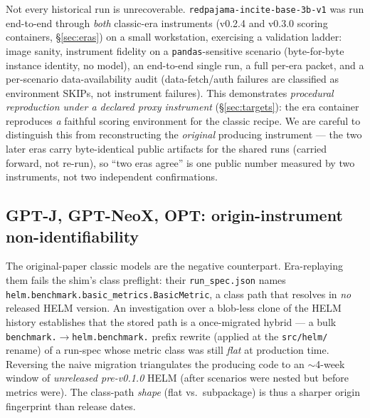 Not every historical run is unrecoverable. \texttt{redpajama-incite-base-3b-v1}
\citep{together2023redpajama} was run end-to-end through \emph{both} classic-era instruments (v0.2.4 and v0.3.0
scoring containers, \S\ref{sec:eras}) on a small workstation, exercising a
validation ladder: image sanity, instrument fidelity on a \texttt{pandas}-sensitive
scenario (byte-for-byte instance identity, no model), an end-to-end single run, a
full per-era packet, and a per-scenario data-availability audit (data-fetch/auth
failures are classified as environment SKIPs, not instrument failures). This
demonstrates \emph{procedural reproduction under a declared proxy instrument}
(\S\ref{sec:targets}): the era container reproduces \emph{a} faithful scoring
environment for the classic recipe. We are careful to distinguish this from
reconstructing the \emph{original} producing instrument --- the two later eras
carry byte-identical public artifacts for the shared runs (carried forward, not
re-run), so ``two eras agree'' is one public number measured by two instruments,
not two independent confirmations.
\par\smallskip\noindent{}\par\smallskip

\subsection{GPT-J, GPT-NeoX, OPT: origin-instrument non-identifiability}
\label{sec:classic}

The original-paper classic models
\citep{wang2021gptj,black2022gptneox,zhang2022opt} are the negative counterpart.
Era-replaying them
fails the shim's class preflight: their \texttt{run\_spec.json} names
\texttt{helm.benchmark.basic\_metrics.BasicMetric}, a class path that resolves in
\emph{no} released HELM version. An investigation over a blob-less clone of the
HELM history establishes that the stored path is a once-migrated hybrid --- a bulk
\texttt{benchmark.}$\to$\texttt{helm.benchmark.} prefix rewrite (applied at the
\texttt{src/helm/} rename) of a run-spec whose metric class was still \emph{flat} at
production time. Reversing the naive migration triangulates the producing code to
an ${\sim}$4-week window of \emph{unreleased pre-v0.1.0} HELM (after scenarios
were nested but before metrics were). The class-path \emph{shape} (flat vs.\
subpackage) is thus a sharper origin fingerprint than release dates.

